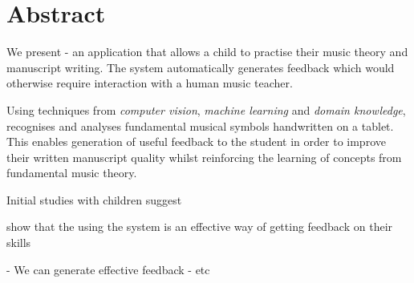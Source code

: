 \chapter*{Abstract}
We present \noteED - an application that allows a child to practise their music theory and manuscript writing. The system automatically generates feedback which would otherwise require interaction with a human music teacher.

Using techniques from \emph{computer vision}, \emph{machine learning} and \emph{domain knowledge}, \noteED recognises and analyses fundamental musical symbols handwritten on a tablet. This enables generation of useful feedback to the student in order to improve their written manuscript quality whilst reinforcing the learning of concepts from fundamental music theory.

Initial studies with children suggest

show that the using the system is an effective way of getting feedback on their skills

- We can generate effective feedback
- etc

%
